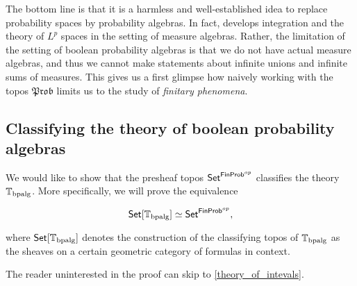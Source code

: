 \documentclass[a4paper]{amsproc}
\theoremstyle{plain}
\theoremstyle{definition}
\theoremstyle{remark}
\numberwithin{equation}{section}
\newcommand{\Set}{\textup{\textsf{Set}}}
\newcommand{\FinProb}{\textup{\textsf{FinProb}}}
\newcommand{\Prob}{\mathfrak{Prob}}
\begin{document}
The bottom line is that it is a harmless and well-established idea to replace probability spaces by probability algebras. In fact, \cite{fremlin2012measure} develops integration and the theory of $L^p$ spaces in the setting of measure algebras. Rather, the limitation of the setting of boolean probability algebras is that we do not have actual measure algebras, and thus we cannot make statements about infinite unions and infinite sums of measures. This gives us a first glimpse how naively working with the topos $\Prob$ limits us to the study of \emph{finitary phenomena}.

\subsection{Classifying the theory of boolean probability algebras}

We would like to show that the presheaf topos \newline $\Set^{\FinProb^{op}}$ classifies the theory $\mathbb{T}_{\textup{bpalg}}$. More specifically, we will prove the equivalence

\begin{equation}\label{equiv}
    \Set[\mathbb{T}_{\textup{bpalg}}] \simeq \Set^{\FinProb^{op}} ,
\end{equation}

where $\Set[\mathbb{T}_{\textup{bpalg}}]$ denotes the construction of the classifying topos of $\mathbb{T}_{\textup{bpalg}}$ as the sheaves on a certain geometric category of formulas in context.

The reader uninterested in the proof can skip to \ref{theory_of_intevals}.
\end{document}
